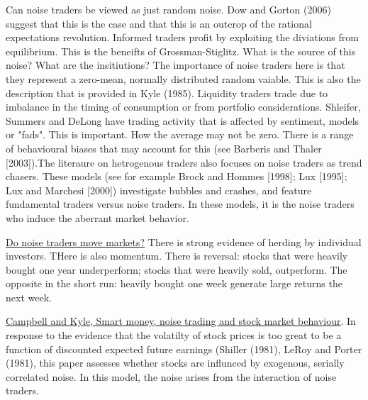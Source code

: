 \documentclass[12pt, a4paper, oneside]{article} %
\begin{document}
Can noise traders be viewed as just random noise.  Dow and Gorton (2006) suggest that this is the case and that this is an outcrop of the rational expectations revolution. Informed traders profit by exploiting the diviations from equilibrium. This is the beneifts of Grossman-Stiglitz. What is the source of this noise?  What are the insitiutions? The importance of noise traders here is that they represent a zero-mean, normally distributed random vaiable.  This is also the description that is provided in Kyle (1985).  Liquidity traders trade due to imbalance in the timing of consumption or from portfolio considerations. Shleifer, Summers and DeLong have trading activity that is affected by sentiment, models or "fads".  This is important.  How the average may not be zero. There is a range of behavioural biases that may account for this (see Barberis and Thaler [2003]).The literaure on hetrogenous traders also focuses on noise traders as trend chasers.  These models (see 
for example Brock and Hommes [1998]; Lux [1995]; Lux and Marchesi [2000]) investigate bubbles and 
crashes, and feature fundamental traders versus noise traders. In these models, it is the noise traders who 
induce the aberrant market behavior.  

\href{http://papers.ssrn.com.ezproxy.liv.ac.uk/sol3/papers.cfm?abstract_id=869827}{Do noise traders move markets?}  There is strong evidence of herding by individual investors. THere is also momentum. There is reversal:  stocks that were heavily bought one year underperform; stocks that were heavily sold, outperform. The opposite in the short run:  heavily bought one week generate large returns the next week. 

\href{http://restud.oxfordjournals.org.ezproxy.liv.ac.uk/content/60/1/1.full.pdf+html}{Campbell and Kyle, Smart money, noise trading and stock market behaviour}. In response to the evidence that the volatilty of stock prices is too great to be a function of discounted expected future earnings (Shiller (1981),  LeRoy and Porter (1981), this paper assesses whether stocks are influnced by exogenous, serially correlated noise. In this model, the noise arises from the interaction of noise traders. 
\end{document}
